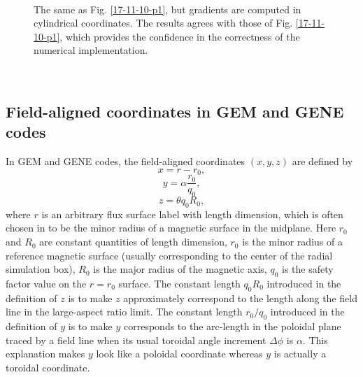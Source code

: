 \documentclass{llncs}
\begin{document}
\begin{figure}[h]
  
  
  
  \
  \caption{The same as Fig. \ref{17-11-10-p1}, but gradients are computed in
  cylindrical coordinates. The results agrees with those of Fig.
  \ref{17-11-10-p1}, which provides the confidence in the correctness of the
  numerical implementation.}
\end{figure}

\

\subsection{Field-aligned coordinates in GEM{\cite{ychen2007}} and
GENE{\cite{gorler2016}} codes}

In GEM{\cite{ychen2007}} and GENE{\cite{gorler2016}} codes, the field-aligned
coordinates $(x, y, z)$ are defined by
\begin{equation}
  x = r - r_0,
\end{equation}
\begin{equation}
  y = \alpha \frac{r_0}{q_0},
\end{equation}
\begin{equation}
  z = \theta q_0 R_0,
\end{equation}
where $r$ is an arbitrary flux surface label with length dimension, which is
often chosen in {\codestar{GEM}} to be the minor radius of a magnetic surface
in the midplane. Here $r_0$ and $R_0$ are constant quantities of length
dimension, $r_0$ is the minor radius of a reference magnetic surface (usually
corresponding to the center of the radial simulation box), $R_0$ is the major
radius of the magnetic axis, $q_0$ is the safety factor value on the $r = r_0$
surface. The constant length $q_0 R_0$ introduced in the definition of $z$ is
to make $z$ approximately correspond to the length along the field line in the
large-aspect ratio limit. The constant length $r_0 / q_0$ introduced in the
definition of $y$ is to make $y$ corresponds to the arc-length in the poloidal
plane traced by a field line when its usual toroidal angle increment $\Delta
\phi$ is $\alpha$. This explanation makes $y$ look like a poloidal coordinate
whereas $y$ is actually a toroidal coordinate.
\end{document}
